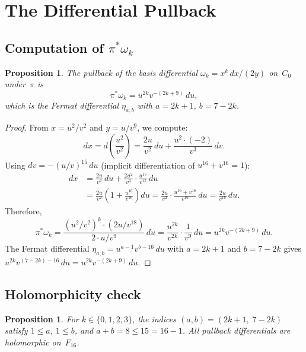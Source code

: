 \documentclass[11pt]{article}
\theoremstyle{plain}
\newtheorem{proposition}[theorem]{Proposition}
\theoremstyle{definition}
\theoremstyle{remark}
\begin{document}
\section{The Differential Pullback}
\label{sec:differential}

\subsection{Computation of $\pi^*\omega_k$}

\begin{proposition}\label{prop:pullback}
The pullback of the basis differential
$\omega_k = x^k\,dx/(2y)$ on~$C_0$ under~$\pi$ is
\[
  \pi^*\omega_k = u^{2k} v^{-(2k+9)}\,du,
\]
which is the Fermat differential $\eta_{a,b}$ with
$a = 2k+1$, $b = 7 - 2k$.
\end{proposition}

\begin{proof}
From $x = u^2/v^2$ and $y = u/v^9$, we compute:
\[
  dx = d\!\left(\frac{u^2}{v^2}\right)
  = \frac{2u}{v^2}\,du
    + \frac{u^2 \cdot (-2)}{v^3}\,dv.
\]
Using $dv = -(u/v)^{15}\,du$ (implicit differentiation
of $u^{16} + v^{16} = 1$):
\begin{align*}
  dx &= \frac{2u}{v^2}\,du
    + \frac{2u^2}{v^3} \cdot \frac{u^{15}}{v^{15}}\,du \\
  &= \frac{2u}{v^2}\left(1 + \frac{u^{16}}{v^{16}}\right) du
  = \frac{2u}{v^2} \cdot \frac{u^{16} + v^{16}}{v^{16}}\,du
  = \frac{2u}{v^{18}}\,du.
\end{align*}
Therefore,
\[
  \pi^*\omega_k
  = \frac{(u^2/v^2)^k \cdot (2u/v^{18})}{2 \cdot u/v^9}\,du
  = \frac{u^{2k}}{v^{2k}} \cdot \frac{1}{v^9}\,du
  = u^{2k} v^{-(2k+9)}\,du.
\]
The Fermat differential $\eta_{a,b} = u^{a-1} v^{b-16}\,du$ with
$a = 2k+1$ and $b = 7-2k$ gives
$u^{2k} v^{(7-2k)-16}\,du = u^{2k} v^{-(2k+9)}\,du$.
\end{proof}

\subsection{Holomorphicity check}

\begin{proposition}\label{prop:holo}
For $k \in \{0,1,2,3\}$, the indices $(a,b) = (2k+1,\; 7-2k)$
satisfy $1 \leq a$, $1 \leq b$, and
$a + b = 8 \leq 15 = 16 - 1$.  All pullback differentials are
holomorphic on~$F_{16}$.
\end{proposition}
\end{document}
